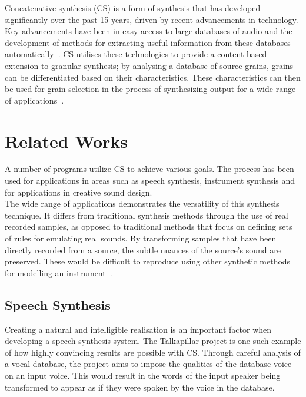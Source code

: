 \documentclass[titlepage]{scrartcl}
\begin{document}
    Concatenative synthesis (CS) is a form of synthesis that has developed
    significantly over the past 15 years, driven by recent advancements in
    technology. Key advancements have been in easy access to large databases of
    audio and the development of methods for extracting useful information from
    these databases automatically~\parencite[p.1]{Schwarz2006a}.  CS utilises
    these technologies to provide a content-based extension to granular
    synthesis; by analysing a database of source grains, grains can be
    differentiated based on their characteristics.  These characteristics can
    then be used for grain selection in the process of synthesizing output for
    a wide range of applications~\parencite[p.102]{Schwarz2007}.

    \section*{Related Works}
    A number of programs utilize CS to achieve various goals. The process has
    been used for applications in areas such as speech synthesis, instrument
    synthesis and for applications in creative sound design.\\
    The wide range of applications demonstrates the versatility of this
    synthesis technique. It differs from traditional synthesis methods through
    the use of real recorded samples, as opposed to traditional methods that
    focus on defining sets of rules for emulating real sounds. By transforming
    samples that have been directly recorded from a source, the subtle nuances
    of the source's sound are preserved. These would be difficult to reproduce
    using other synthetic methods for modelling an
    instrument~\parencite[p.24]{Maestre2009}.

    \subsection*{Speech Synthesis}
    Creating a natural and intelligible realisation is an important factor when
    developing a speech synthesis system. The Talkapillar project is one such
    example of how highly convincing results are possible with CS. Through
    careful analysis of a vocal database, the project aims to impose the
    qualities of the database voice on an input voice. This would result in the
    words of the input speaker being transformed to appear as if they were
    spoken by the voice in the database.~\parencite{Hueber}
    
\end{document}
